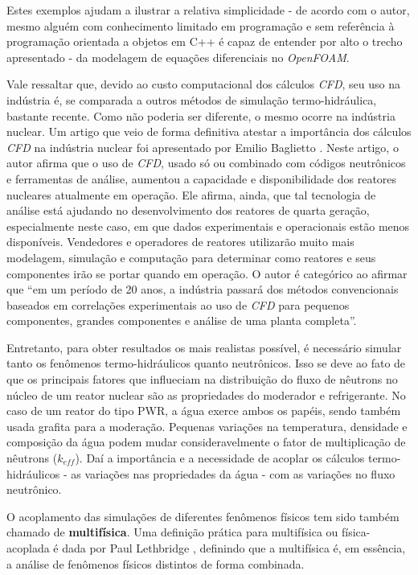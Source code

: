 Estes exemplos ajudam a ilustrar a relativa simplicidade - de acordo com o autor, mesmo
alguém com conhecimento limitado em programação e sem referência à programação orientada
a objetos em C++ é capaz de entender por alto o trecho apresentado - da modelagem
de equações diferenciais no \textit{OpenFOAM}.

Vale ressaltar que, devido ao custo computacional dos cálculos \textit{CFD}, seu uso na indústria
é, se comparada a outros métodos de simulação termo-hidráulica, bastante recente.
Como não poderia ser diferente, o mesmo ocorre na indústria nuclear. Um artigo que
veio de forma definitiva atestar a importância dos cálculos \textit{CFD} na indústria nuclear
foi apresentado por Emilio Baglietto \cite{Baglietto2011}. Neste artigo, o autor afirma
que o uso de \textit{CFD}, usado só ou combinado com códigos neutrônicos e ferramentas
de análise, aumentou a capacidade e disponibilidade dos reatores nucleares
atualmente em operação. Ele afirma,
ainda, que tal tecnologia de análise está ajudando no desenvolvimento dos reatores
de quarta geração, especialmente neste caso, em que dados experimentais e operacionais
estão menos disponíveis. Vendedores e operadores de reatores utilizarão muito mais
modelagem, simulação e computação para determinar como reatores e seus componentes
irão se portar quando em operação. O autor é categórico ao afirmar que ``em um
período de 20 anos, a indústria passará dos métodos convencionais baseados em
correlações experimentais ao uso de \textit{CFD} para pequenos componentes, grandes componentes
e análise de uma planta completa''. 

Entretanto, para obter resultados os mais realistas possível, é necessário simular 
tanto os fenômenos termo-hidráulicos quanto neutrônicos. Isso 
se deve ao fato de que os principais fatores que influeciam na distribuição do fluxo de 
nêutrons no núcleo de um reator nuclear são as propriedades do moderador e refrigerante. No caso de um
reator do tipo PWR, a água exerce ambos os papéis, sendo também usada grafita para 
a moderação. Pequenas variações na temperatura, densidade e composição 
da água podem mudar consideravelmente o fator de multiplicação de nêutrons ($k_{eff}$). Daí a importância e 
a necessidade de acoplar os cálculos termo-hidráulicos - as variações nas propriedades da água - com as variações 
no fluxo neutrônico.

O acoplamento das simulações de diferentes fenômenos físicos tem sido também chamado de
\textbf{multifísica}. 
Uma definição prática para multifísica ou física-acoplada é dada por Paul Lethbridge \cite{Lethbridge2005}, definindo que 
a multifísica é, em essência, a análise de fenômenos físicos distintos de forma combinada.

